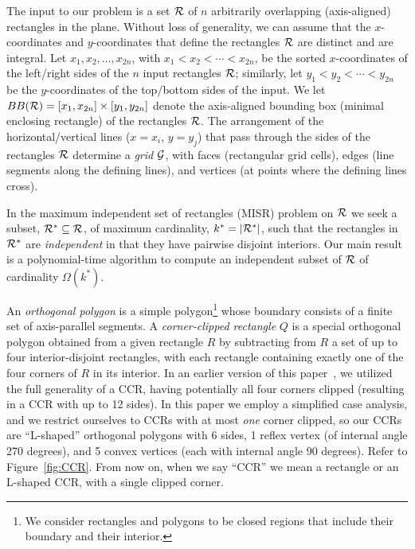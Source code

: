 \documentclass{article}
\newcommand{\B}{BB({\cal R})}
\begin{document}
The input to our problem is a set ${\cal R}$ of $n$ arbitrarily
overlapping (axis-aligned) rectangles in the plane.  Without loss of
generality, we can assume that the $x$-coordinates and $y$-coordinates
that define the rectangles ${\cal R}$ are distinct and are
integral. Let $x_1,x_2,\ldots,x_{2n}$, with $x_1< x_2< \cdots <
x_{2n}$, be the sorted $x$-coordinates of the left/right sides of the
$n$ input rectangles ${\cal R}$; similarly, let $y_1< y_2 < \cdots <
y_{2n}$ be the $y$-coordinates of the top/bottom sides of the input.
%
%
We let $\B=[x_1,x_{2n}]\times[y_1,y_{2n}]$ denote the axis-aligned
bounding box (minimal enclosing rectangle) of the rectangles ${\cal
  R}$.  The arrangement of the horizontal/vertical lines ($x=x_i$,
$y=y_j$) that pass through the sides of the rectangles ${\cal R}$
determine a {\em grid} ${\cal G}$, with faces (rectangular grid
cells), edges (line segments along the defining lines), and vertices
(at points where the defining lines cross).
%

In the maximum independent set of rectangles (MISR) problem on ${\cal
  R}$ we seek a subset, ${\cal R}^*\subseteq {\cal R}$, of maximum
cardinality, $k^*=|{\cal R}^*|$, such that the rectangles in ${\cal
  R}^*$ are {\em independent} in that they have pairwise disjoint
interiors. Our main result is a polynomial-time algorithm to compute
an independent subset of ${\cal R}$ of cardinality $\Omega(k^*)$.

\medskip
{}\quad
An {\em orthogonal polygon} is a simple polygon\footnote{We consider
  rectangles and polygons to be closed regions that include their
  boundary and their interior.} whose boundary consists of a finite
set of axis-parallel segments.  A {\em corner-clipped rectangle} $Q$
is a special orthogonal polygon obtained from a given rectangle $R$ by subtracting from $R$ a set of up to
four interior-disjoint rectangles, with each
rectangle containing exactly one of the four corners of $R$ in its interior.
%
In an earlier version of this
paper~\cite{DBLP:journals/corr/abs-2101-00326}, we utilized the full
generality of a CCR, having potentially all four corners clipped (resulting in a CCR with
up to 12 sides).  In this paper we employ a simplified case analysis, and we restrict ourselves to CCRs
with at most {\em one} corner clipped, so our CCRs are 
``L-shaped'' orthogonal polygons with 6 sides, 1 reflex vertex (of
internal angle 270 degrees), and 5 convex vertices (each with internal
angle 90 degrees).  Refer to Figure~\ref{fig:CCR}.
%
From now on, when we say ``CCR'' we mean a rectangle or an L-shaped CCR, with a single clipped corner.
\end{document}

